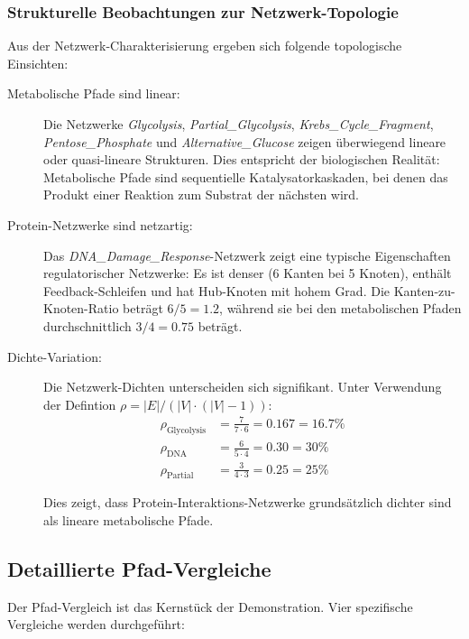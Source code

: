 ﻿\documentclass[a4paper,12pt]{article}
\theoremstyle{definition}
\begin{document}
\subsubsection{Strukturelle Beobachtungen zur Netzwerk-Topologie}

Aus der Netzwerk-Charakterisierung ergeben sich folgende topologische Einsichten:

\begin{description}
	\item[Metabolische Pfade sind linear:] Die Netzwerke \textit{Glycolysis}, \textit{Partial\_Glycolysis}, \textit{Krebs\_\newline Cycle\_Fragment}, \textit{Pentose\_Phosphate} und \textit{Alternative\_Glucose} zeigen überwiegend lineare oder quasi-lineare Strukturen. Dies entspricht der biologischen Realität: Metabolische Pfade sind sequentielle Katalysatorkaskaden, bei denen das Produkt einer Reaktion zum Substrat der nächsten wird.
	
	\item[Protein-Netzwerke sind netzartig:] Das \textit{DNA\_Damage\_Response}-Netzwerk zeigt eine typische Eigenschaften regulatorischer Netzwerke: Es ist denser (6 Kanten bei 5 Knoten), enthält Feedback-Schleifen und hat Hub-Knoten mit hohem Grad. Die Kanten-zu-Knoten-Ratio beträgt $6/5 = 1.2$, während sie bei den metabolischen Pfaden durchschnittlich $3/4 = 0.75$ beträgt.
	
	\item[Dichte-Variation:] Die Netzwerk-Dichten unterscheiden sich signifikant. Unter Verwendung der Defintion $\rho = |E| / (|V| \cdot (|V|-1))$:
	\begin{align*}
		\rho_{\text{Glycolysis}} &= \frac{7}{7 \cdot 6} = 0.167 = 16.7\% \\
		\rho_{\text{DNA}} &= \frac{6}{5 \cdot 4} = 0.30 = 30\% \\
		\rho_{\text{Partial}} &= \frac{3}{4 \cdot 3} = 0.25 = 25\%
	\end{align*}
	
	Dies zeigt, dass Protein-Interaktions-Netzwerke grundsätzlich dichter sind als lineare metabolische Pfade.
\end{description}

\subsection{Detaillierte Pfad-Vergleiche}

Der Pfad-Vergleich ist das Kernstück der Demonstration. Vier spezifische Vergleiche werden durchgeführt:
\end{document}
